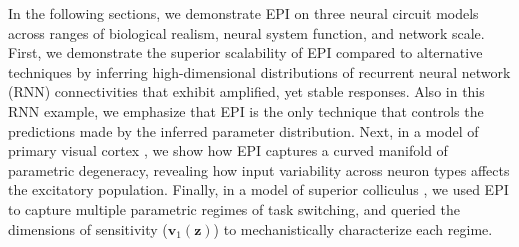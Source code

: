\documentclass[11pt]{article}
\begin{document}
In the following sections, we demonstrate EPI on three neural circuit models across ranges of biological realism, neural system function, and network scale.
First, we demonstrate the superior scalability of EPI compared to alternative techniques by inferring high-dimensional distributions of recurrent neural network (RNN) connectivities that exhibit amplified, yet stable responses.
Also in this RNN example, we emphasize that EPI is the only technique that controls the predictions made by the inferred parameter distribution.
Next, in a model of primary visual cortex \cite{litwin2016inhibitory, palmigiano2020structure}, we show how EPI captures a curved manifold of parametric degeneracy, revealing how input variability across neuron types affects the excitatory population.
Finally, in a model of superior colliculus \cite{duan2018collicular}, we used EPI to capture multiple parametric regimes of task switching, and queried the dimensions of sensitivity ($\mathbf{v}_1(\mathbf{z})$) to mechanistically characterize each regime.
\end{document}

